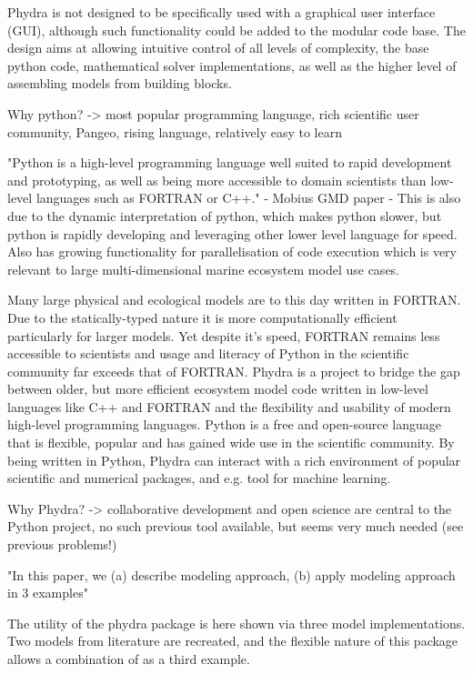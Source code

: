 \documentclass[journal abbreviations, manuscript]{copernicus}
\begin{document}
Phydra is not designed to be specifically used with a graphical user interface (GUI), although such functionality could be added to the modular code base.
The design aims at allowing intuitive control of all levels of complexity, the base python code, mathematical solver implementations, as well as the higher level of assembling models from building blocks.

Why python? -> most popular programming language, rich scientific user community, Pangeo, rising language, relatively easy to learn

"Python is a high-level programming language well suited to rapid development and prototyping, as well as being more accessible to domain scientists than low-level languages such as FORTRAN or C++." - Mobius GMD paper
- This is also due to the dynamic interpretation of python, which makes python slower, but python is rapidly developing and leveraging other lower level language for speed. Also has growing functionality for parallelisation of code execution which is very relevant to large multi-dimensional marine ecosystem model use cases. 

Many large physical and ecological models are to this day written in FORTRAN. Due to the statically-typed nature it is more computationally efficient particularly for larger models. Yet despite it's speed, FORTRAN remains less accessible to scientists and usage and literacy of Python in the scientific community far exceeds that of FORTRAN.
Phydra is a project to bridge the gap between older, but more efficient ecosystem model code written in low-level languages like C++ and FORTRAN and the flexibility and usability of modern high-level programming languages. Python is a free and open-source language that is flexible, popular and has gained wide use in the scientific community. By being written in Python, Phydra can interact with a rich environment of popular scientific and numerical packages, and e.g. tool for machine learning. 


Why Phydra? -> collaborative development and open science are central to the Python project, no such previous tool available, but seems very much needed (see previous problems!)

"In this paper, we (a) describe modeling approach, (b) apply modeling approach in 3 examples"

The utility of the phydra package is here shown via three model implementations. Two models from literature are recreated, and the flexible nature of this package allows a combination of as a third example. 
\end{document}
